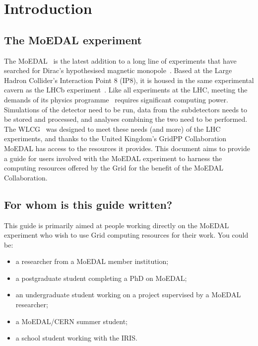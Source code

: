 \section{Introduction}
\label{sec:intro}
\subsection{The MoEDAL experiment}
\label{sec:intromoedal}
The \ac{MoEDAL}~\cite{MoEDAL2009}
is the latest addition to a long line of experiments that have searched for
Dirac's hypothesised magnetic monopole~\cite{Dirac1931}.
%
Based at the Large Hadron Collider's Interaction Point 8 (IP8),
it is housed in the same experimental cavern as
the \acs{LHCb} experiment~\cite{LHCb2008}.
%
Like all experiments at the \acs{LHC},
meeting the demands of its physics programme~\cite{MoEDAL2014}
requires significant computing power.
Simulations of the detector need to be run,
data from the subdetectors needs to be stored and processed,
and analyses combining the two need to be performed.
%
The \ac{WLCG}~\cite{WLCG2005} was
designed to meet these needs (and more) of the \ac{LHC}
experiments, and thanks to the
United Kingdom's GridPP Collaboration~\cite{gridpp2006,gridpp2009}
\ac{MoEDAL} has access to the resources it provides.
%
This document aims to provide a guide for users involved
with the \ac{MoEDAL} experiment to harness the computing resources
offered by the Grid for the benefit of the
\ac{MoEDAL} Collaboration.

\subsection{For whom is this guide written?}
\label{sec:forwhom}
This guide is primarily aimed at people working directly on
the \ac{MoEDAL} experiment who wish to use Grid computing resources
for their work. You could be:

\begin{itemize}
\item a researcher from a \ac{MoEDAL} member institution;
\item a postgraduate student completing a PhD on \ac{MoEDAL};
\item an undergraduate student working on a project supervised by 
a \ac{MoEDAL} researcher;
\item a \ac{MoEDAL}/\acs{CERN} summer student;
\item a school student working with the \acf{IRIS}.
\end{itemize}

